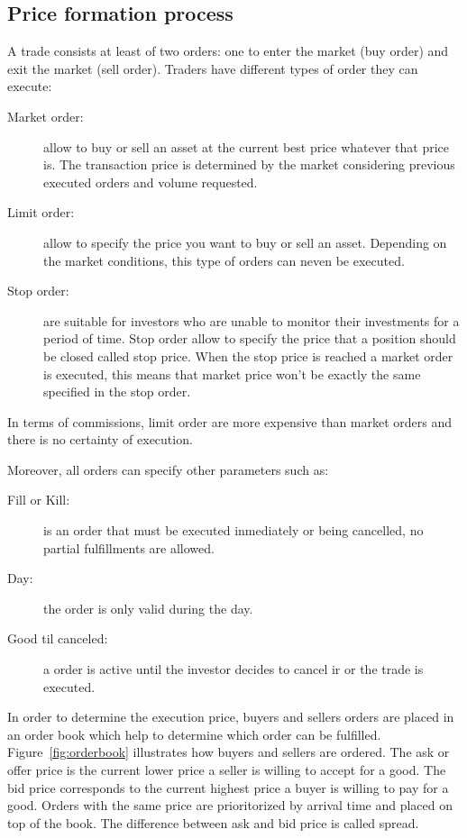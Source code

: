 \subsection{Price formation process}

A trade consists at least of two orders: one to enter the market (buy order) and
exit the market (sell order). Traders have different types of order they can
execute:

\begin{description}
\item[Market order:] allow to buy or sell an asset at the current best price
whatever that price is. The transaction price is determined by the market
considering previous executed orders and volume requested.
\item[Limit order:] allow to specify the price you want to buy or sell an asset.
Depending on the market conditions, this type of orders can neven be executed.
\item[Stop order:] are suitable for investors who are unable to monitor their
investments for a period of time. Stop order allow to specify the price that a
position should be closed called stop price. When the stop price is reached a
market order is executed, this means that market price won't be exactly the same
specified in the stop order.
\end{description}

In terms of commissions, limit order are more expensive than market orders and
there is no certainty of execution.

Moreover, all orders can specify other parameters such as: 

\begin{description}
\item[Fill or Kill:] is an order that must be executed inmediately or being
cancelled, no partial fulfillments are allowed. 
\item[Day:] the order is only valid during the day.
\item[Good til canceled:] a order is active until the investor decides to cancel
ir or the trade is executed.
\end{description}

In order to determine the execution price, buyers and sellers orders are placed
in an order book which help to determine which order can be fulfilled.
Figure~\ref{fig:orderbook} illustrates how buyers and sellers are ordered. The
ask or offer price is the current lower price a seller is willing to accept for
a good. The bid price corresponds to the current highest price a buyer is
willing to pay for a good. Orders with the same price are prioritorized by
arrival time and placed on top of the book.  The difference between ask and bid
price is called spread.

